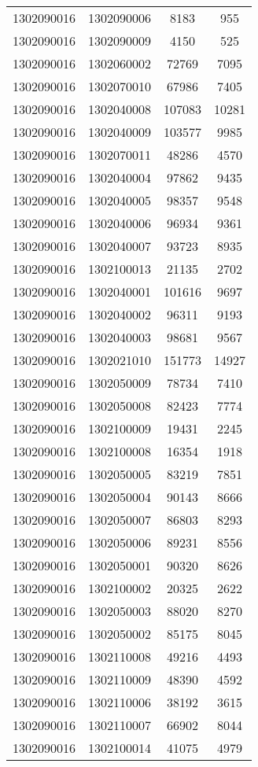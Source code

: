 \begin{longtable}{llcc}
1302090016 & 1302090006 & 8183 & 955\\
1302090016 & 1302090009 & 4150 & 525\\
1302090016 & 1302060002 & 72769 & 7095\\
1302090016 & 1302070010 & 67986 & 7405\\
1302090016 & 1302040008 & 107083 & 10281\\
1302090016 & 1302040009 & 103577 & 9985\\
1302090016 & 1302070011 & 48286 & 4570\\
1302090016 & 1302040004 & 97862 & 9435\\
1302090016 & 1302040005 & 98357 & 9548\\
1302090016 & 1302040006 & 96934 & 9361\\
1302090016 & 1302040007 & 93723 & 8935\\
1302090016 & 1302100013 & 21135 & 2702\\
1302090016 & 1302040001 & 101616 & 9697\\
1302090016 & 1302040002 & 96311 & 9193\\
1302090016 & 1302040003 & 98681 & 9567\\
1302090016 & 1302021010 & 151773 & 14927\\
1302090016 & 1302050009 & 78734 & 7410\\
1302090016 & 1302050008 & 82423 & 7774\\
1302090016 & 1302100009 & 19431 & 2245\\
1302090016 & 1302100008 & 16354 & 1918\\
1302090016 & 1302050005 & 83219 & 7851\\
1302090016 & 1302050004 & 90143 & 8666\\
1302090016 & 1302050007 & 86803 & 8293\\
1302090016 & 1302050006 & 89231 & 8556\\
1302090016 & 1302050001 & 90320 & 8626\\
1302090016 & 1302100002 & 20325 & 2622\\
1302090016 & 1302050003 & 88020 & 8270\\
1302090016 & 1302050002 & 85175 & 8045\\
1302090016 & 1302110008 & 49216 & 4493\\
1302090016 & 1302110009 & 48390 & 4592\\
1302090016 & 1302110006 & 38192 & 3615\\
1302090016 & 1302110007 & 66902 & 8044\\
1302090016 & 1302100014 & 41075 & 4979\\

\end{longtable}
